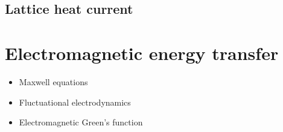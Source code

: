 \subsection{Lattice heat current}



\section{Electromagnetic energy transfer}

\begin{itemize}
 \item Maxwell equations
 \item Fluctuational electrodynamics
 \item Electromagnetic Green's function
\end{itemize}


